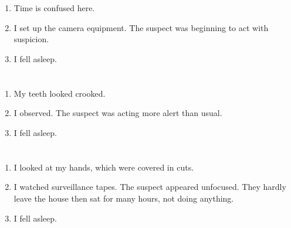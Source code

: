 \documentclass{article}
\begin{document}
    \newpage
    
    \section{}
    
    \begin{enumerate}
    
    \item Time is confused here.\\
    
    \item I set up the camera equipment. The suspect was beginning to act with suspicion.\\
    
    \item I fell asleep.\\
    
    \end{enumerate}
     
    \newpage
    
    \section{}
    
    \begin{enumerate}
    
    \item My teeth looked crooked.\\
    
    \item I observed. The suspect was acting more alert than usual.\\
    
    \item I fell asleep.\\
    
    \end{enumerate}
     
    \newpage
    
    \section{}
    
    \begin{enumerate}
    
    \item I looked at my hands, which were covered in cuts.\\
    
    \item I watched surveillance tapes. The suspect appeared unfocused. They hardly leave the house then sat for many hours, not doing anything.\\
    
    \item I fell asleep.\\
    
    \end{enumerate}
     
\end{document}
